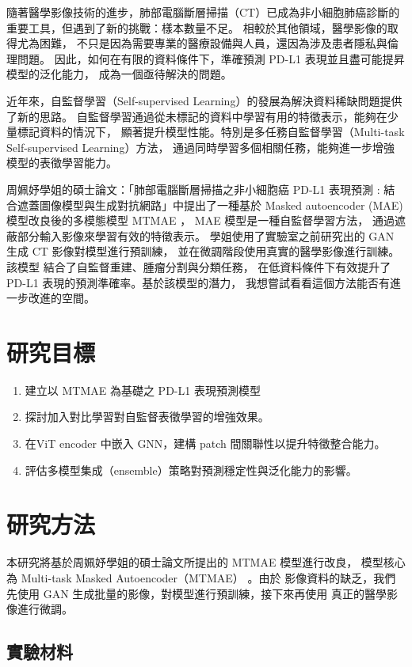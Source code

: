 \documentclass[12pt,a4paper]{article}
\begin{document}
隨著醫學影像技術的進步，肺部電腦斷層掃描（CT）已成為非小細胞肺癌診斷的重要工具，但遇到了新的挑戰：樣本數量不足。
相較於其他領域，醫學影像的取得尤為困難，
不只是因為需要專業的醫療設備與人員，還因為涉及患者隱私與倫理問題。
因此，如何在有限的資料條件下，準確預測 PD-L1 表現並且盡可能提昇模型的泛化能力，
成為一個亟待解決的問題。

近年來，自監督學習（Self-supervised Learning）的發展為解決資料稀缺問題提供了新的思路。
自監督學習通過從未標記的資料中學習有用的特徵表示，能夠在少量標記資料的情況下，
顯著提升模型性能。特別是多任務自監督學習（Multi-task Self-supervised Learning）方法，
通過同時學習多個相關任務，能夠進一步增強模型的表徵學習能力。

周姵妤學姐的碩士論文：「肺部電腦斷層掃描之非小細胞癌 PD-L1 表現預測 :
結合遮蓋圖像模型與生成對抗網路」中提出了一種基於 Masked autoencoder (MAE)
模型改良後的多模態模型 MTMAE ， MAE 模型是一種自監督學習方法，
通過遮蔽部分輸入影像來學習有效的特徵表示。
學姐使用了實驗室之前研究出的 GAN 生成 CT 影像對模型進行預訓練，
並在微調階段使用真實的醫學影像進行訓練。該模型
結合了自監督重建、腫瘤分割與分類任務，
在低資料條件下有效提升了 PD-L1 表現的預測準確率。基於該模型的潛力，
我想嘗試看看這個方法能否有進一步改進的空間。

\section{研究目標}
\begin{enumerate}
  \item 建立以 MTMAE 為基礎之 PD-L1 表現預測模型
  \item 探討加入對比學習對自監督表徵學習的增強效果。
  \item 在ViT encoder 中嵌入 GNN，建構 patch 間關聯性以提升特徵整合能力。
  \item 評估多模型集成（ensemble）策略對預測穩定性與泛化能力的影響。
\end{enumerate}

\section{研究方法}
本研究將基於周姵妤學姐的碩士論文所提出的 MTMAE 模型進行改良，
模型核心為 Multi-task Masked Autoencoder（MTMAE） 。由於
影像資料的缺乏，我們先使用 GAΝ 生成批量的影像，對模型進行預訓練，接下來再使用
真正的醫學影像進行微調。

\subsection{實驗材料}
\end{document}
